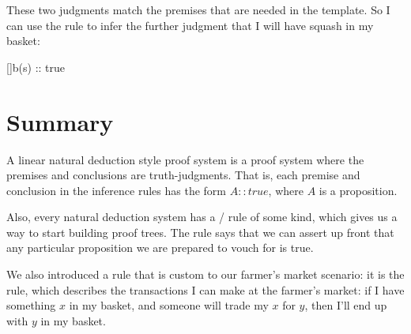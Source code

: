 \documentclass[../../../main.tex]{subfiles}
\begin{document}
\noindent
These two judgments match the premises that are needed in the  template. So I can use the  rule to infer the further judgment that I will have squash in my basket:

\begin{prooftree*}
  \hypo{}
  \ellipsis{}{}

  \hypo{}
  \ellipsis{}{}  

  []{b(s) :: true}
\end{prooftree*}


\section{Summary}

A linear natural deduction style proof system is a proof system where the premises and conclusions are truth-judgments. That is, each premise and conclusion in the inference rules has the form $A :: true$, where $A$ is a proposition.

Also, every natural deduction system has a \startrule/ rule of some kind, which gives us a way to start building proof trees. The  rule says that we can assert up front that any particular proposition we are prepared to vouch for is true.

We also introduced a rule that is custom to our farmer's market scenario: it is the  rule, which describes the transactions I can make at the farmer's market: if I have something $x$ in my basket, and someone will trade my $x$ for $y$, then I'll end up with $y$ in my basket.
\end{document}
